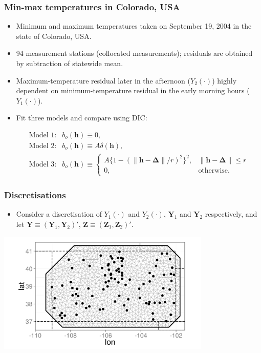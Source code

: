 \documentclass{beamer}
\newcommand{\Deltab} {\boldsymbol{\Delta}}
\newcommand{\h}{\mathbf{h}}
\newcommand{\Yvec}{\mathbf{Y}}
\newcommand{\Zvec}{\mathbf{Z}}
\begin{document}
\begin{frame}
\frametitle{Min-max temperatures in Colorado, USA}

\begin{itemize}
\item Minimum and maximum temperatures taken on September 19, 2004 in the state of Colorado, USA.
\item 94 measurement stations (collocated measurements); residuals are obtained by subtraction of statewide mean.
\item Maximum-temperature residual later in the afternoon ($Y_2(\cdot)$) highly dependent on minimum-temperature residual in the early morning hours ($Y_1(\cdot)$).
\item Fit three models and compare using DIC:

\begin{equation*}
\begin{array}{ll}
\textrm{Model 1:} &b_o(\h) \equiv 0, \\
\textrm{Model 2:} &b_o(\h) \equiv A\delta(\h), \\
\textrm{Model 3:} &b_o(\h) \equiv \left\{\begin{array}{ll} A\{1 - (\|\h - \Deltab\|/r)^2\}^2, & \| \h - \Deltab\| \le r \\ 0, & \textrm{otherwise}. \end{array} \right.
\end{array}
\end{equation*}
\end{itemize}
\end{frame}


\begin{frame}
\frametitle{Discretisations}
\begin{itemize}
\item Consider a discretisation of $Y_1(\cdot)$ and $Y_2(\cdot)$, $\Yvec_1$ and $\Yvec_2$ respectively, and let $\Yvec \equiv (\Yvec_1,\Yvec_2)'$, $\Zvec \equiv (\Zvec_1,\Zvec_2)'$.
\end{itemize}

\vspace{-0.1in}
\begin{center}
\includegraphics[width=4in]{meshplot.png}
\end{center}

\end{frame}
\end{document}
